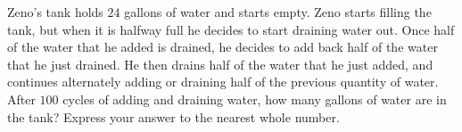 Zeno's tank holds $24$ gallons of water and starts empty. Zeno starts filling the tank, but when it is halfway full he decides to start draining water out. Once half of the water that he added is drained, he decides to add back half of the water that he just drained. He then drains half of the water that he just added, and continues alternately adding or draining half of the previous quantity of water. After $100$ cycles of adding and draining water, how many gallons of water are in the tank? Express your answer to the nearest whole number.
